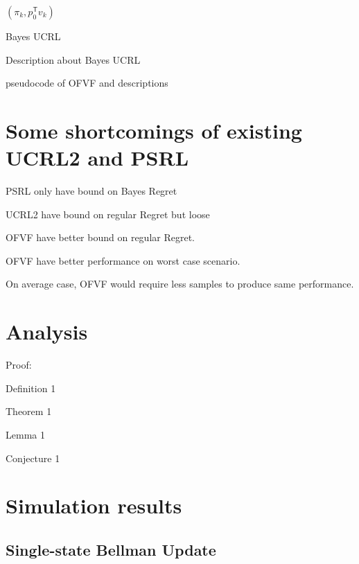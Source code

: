 \documentclass{article}
\newcommand{\tr}{^{\mathsf{T}}}
\begin{document}
\begin{algorithm}
	 \Return $(\pi_k, p_0\tr v_k)$ \;
	 \caption{Bayes UCRL}    \label{alg:IAVF}
\end{algorithm} 

Description about Bayes UCRL

pseudocode of OFVF and descriptions

\section{Some shortcomings of existing UCRL2 and PSRL}

PSRL only have bound on Bayes Regret

UCRL2 have bound on regular Regret but loose

OFVF have better bound on regular Regret.

OFVF have better performance on worst case scenario.

On average case, OFVF would require less samples to produce same
performance.


\section{Analysis}

Proof:

Definition 1

Theorem 1

Lemma 1

Conjecture 1

\section{Simulation results}

\subsection{Single-state Bellman Update}
\end{document}
